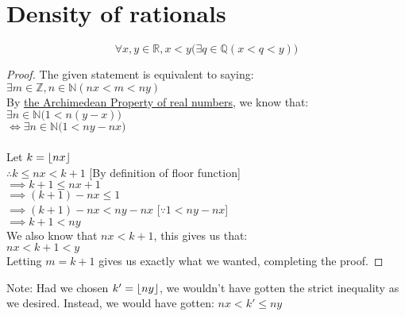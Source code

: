 \section{Density of rationals}\label{sec:ratdense}
$$\forall x, y \in \mathbb{R}, x < y \big(\exists q \in \mathbb{Q}(x < q < y)\big)$$
\begin{proof}
The given statement is equivalent to saying:\\
$\exists m \in \mathbb{Z}, n \in \mathbb{N}(nx < m < ny)$\\
By \hyperref[sec:APoR]{the Archimedean Property of real numbers}, we know that:\\
$\exists n \in \mathbb{N}\big(1 < n(y-x)\big)$\\
$\iff \exists n \in \mathbb{N}\big(1 < ny - nx\big)$\\~\\
Let $k = \lfloor nx \rfloor$\\
$\therefore k \le nx < k+1$ \hfill [By definition of floor function]\\
$\implies k + 1 \le nx + 1$\\
$\implies (k+1) - nx \le 1$\\
$\implies (k+1) - nx < ny -nx$ \hfill [$\because 1 < ny-nx$]\\
$\implies k + 1 < ny$\\
We also know that $nx < k+1$, this gives us that:\\
$nx < k+1 < y$\\
Letting $m = k+1$ gives us exactly what we wanted, completing the proof.
\end{proof}

\hrulefill

Note: Had we chosen $k' = \lfloor ny \rfloor$, we wouldn't have gotten the strict inequality as we desired. Instead, we would have gotten: $nx < k' \le ny$

\hrulefill


\hrulefill
\newpage
